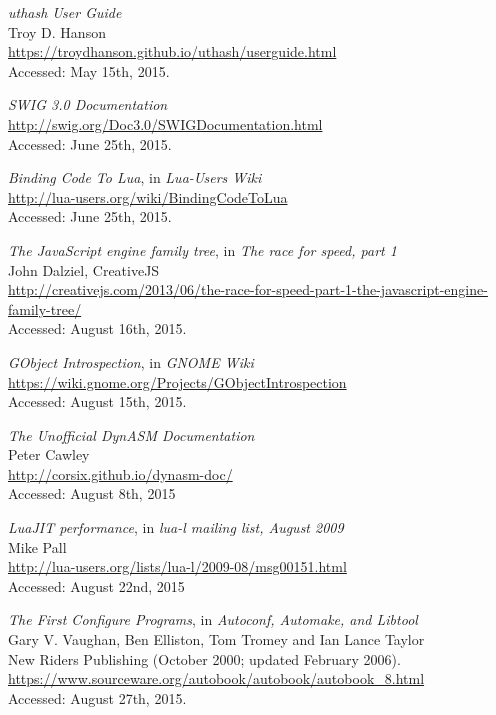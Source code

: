 \begin{thebibliography}{99}
		\emph{uthash User Guide} \\
		Troy D. Hanson \\
		\url{https://troydhanson.github.io/uthash/userguide.html} \\
		Accessed: May 15th, 2015.

		\emph{SWIG 3.0 Documentation} \\
		\url{http://swig.org/Doc3.0/SWIGDocumentation.html} \\
		Accessed: June 25th, 2015.

		\emph{Binding Code To Lua}, in \emph{Lua-Users Wiki} \\
		\url{http://lua-users.org/wiki/BindingCodeToLua} \\
		Accessed: June 25th, 2015.

		\emph{The JavaScript engine family tree},
		in \emph{The race for speed, part 1}  \\
		John Dalziel, CreativeJS \\
		\url{http://creativejs.com/2013/06/the-race-for-speed-part-1-the-javascript-engine-family-tree/} \\
		Accessed: August 16th, 2015.

		\emph{GObject Introspection}, in \emph{GNOME Wiki} \\
		\url{https://wiki.gnome.org/Projects/GObjectIntrospection} \\
		Accessed: August 15th, 2015.

		\emph{The Unofficial DynASM Documentation} \\
		Peter Cawley \\
		\url{http://corsix.github.io/dynasm-doc/} \\
		Accessed: August 8th, 2015

		\emph{LuaJIT performance}, in \emph{lua-l mailing list, August 2009} \\
		Mike Pall \\
		\url{http://lua-users.org/lists/lua-l/2009-08/msg00151.html} \\
		Accessed: August 22nd, 2015

		\emph{The First Configure Programs},
		in \emph{Autoconf, Automake, and Libtool} \\
		Gary V. Vaughan, Ben Elliston, Tom Tromey and Ian Lance Taylor \\
		New Riders Publishing (October 2000; updated February 2006). \\
		\url{https://www.sourceware.org/autobook/autobook/autobook_8.html} \\
		Accessed: August 27th, 2015.


\end{thebibliography}

